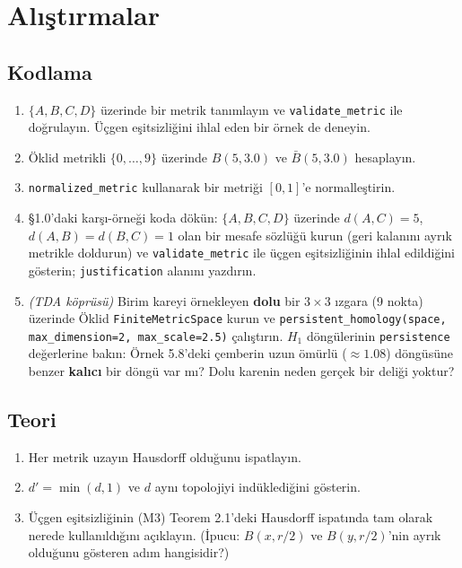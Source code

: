 \section{Alıştırmalar}

\subsection*{Kodlama}

\begin{enumerate}[label=K\arabic*.]
\item $\{A,B,C,D\}$ üzerinde bir metrik tanımlayın ve \texttt{validate\_metric} ile
      doğrulayın. Üçgen eşitsizliğini ihlal eden bir örnek de deneyin.
\item Öklid metrikli $\{0,\ldots,9\}$ üzerinde $B(5,3.0)$ ve $\bar{B}(5,3.0)$
      hesaplayın.
\item \texttt{normalized\_metric} kullanarak bir metriği $[0,1]$'e normalleştirin.
\item \S 1.0'daki karşı-örneği koda dökün: $\{A,B,C,D\}$ üzerinde $d(A,C)=5$,
      $d(A,B)=d(B,C)=1$ olan bir mesafe sözlüğü kurun (geri kalanını ayrık metrikle
      doldurun) ve \texttt{validate\_metric} ile üçgen eşitsizliğinin ihlal
      edildiğini gösterin; \texttt{justification} alanını yazdırın.
\item \emph{(TDA köprüsü)} Birim kareyi örnekleyen \textbf{dolu} bir $3\times 3$
      ızgara (9 nokta) üzerinde Öklid \texttt{FiniteMetricSpace} kurun ve
      \texttt{persistent\_homology(space, max\_dimension=2, max\_scale=2.5)}
      çalıştırın. $H_1$ döngülerinin \texttt{persistence} değerlerine bakın:
      Örnek 5.8'deki çemberin uzun ömürlü ($\approx 1.08$) döngüsüne benzer
      \textbf{kalıcı} bir döngü var mı? Dolu karenin neden gerçek bir deliği yoktur?
\end{enumerate}

\subsection*{Teori}

\begin{enumerate}[label=T\arabic*.]
\item Her metrik uzayın Hausdorff olduğunu ispatlayın.
\item $d' = \min(d,1)$ ve $d$ aynı topolojiyi indüklediğini gösterin.
\item Üçgen eşitsizliğinin (M3) Teorem 2.1'deki Hausdorff ispatında tam olarak
      nerede kullanıldığını açıklayın. (İpucu: $B(x, r/2)$ ve $B(y, r/2)$'nin ayrık
      olduğunu gösteren adım hangisidir?)
\end{enumerate}
